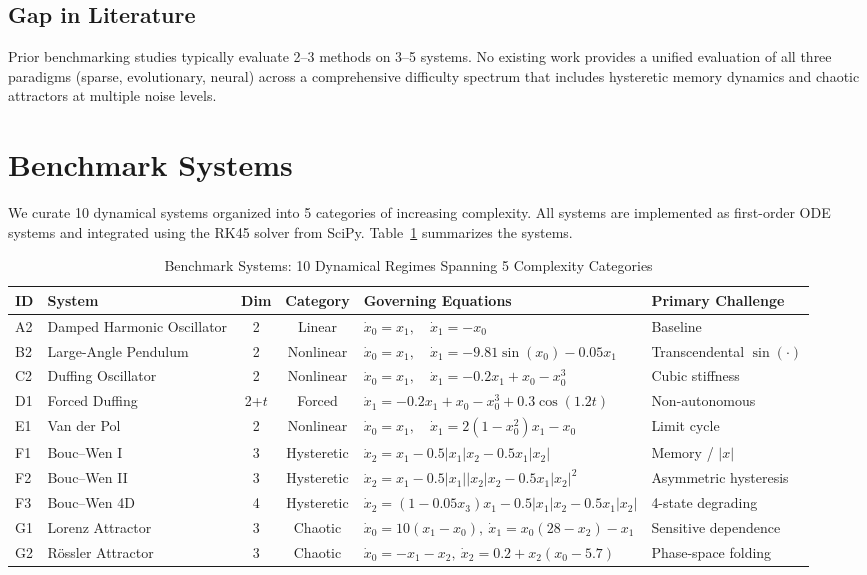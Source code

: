 \documentclass[conference]{IEEEtran}
\begin{document}
\subsection{Gap in Literature}
Prior benchmarking studies typically evaluate 2--3 methods on 3--5 systems. No existing work provides a unified evaluation of all three paradigms (sparse, evolutionary, neural) across a comprehensive difficulty spectrum that includes hysteretic memory dynamics and chaotic attractors at multiple noise levels.

\section{Benchmark Systems}
\label{sec:systems}

We curate 10 dynamical systems organized into 5 categories of increasing complexity. All systems are implemented as first-order ODE systems and integrated using the RK45 solver from SciPy. Table~\ref{tab:systems} summarizes the systems.

\begin{table}[!ht]
\centering
\caption{Benchmark Systems: 10 Dynamical Regimes Spanning 5 Complexity Categories}
\label{tab:systems}
\begin{tabular}{@{}llccll@{}}
\toprule
\textbf{ID} & \textbf{System} & \textbf{Dim} & \textbf{Category} & \textbf{Governing Equations} & \textbf{Primary Challenge} \\
\midrule
A2 & Damped Harmonic Oscillator & 2 & Linear &
$\dot{x}_0 = x_1,\quad \dot{x}_1 = -x_0$ & Baseline \\
\midrule
B2 & Large-Angle Pendulum & 2 & Nonlinear &
$\dot{x}_0 = x_1,\quad \dot{x}_1 = -9.81\sin(x_0) - 0.05 x_1$ & Transcendental $\sin(\cdot)$ \\
\midrule
C2 & Duffing Oscillator & 2 & Nonlinear &
$\dot{x}_0 = x_1,\quad \dot{x}_1 = -0.2 x_1 + x_0 - x_0^3$ & Cubic stiffness \\
\midrule
D1 & Forced Duffing & 2+$t$ & Forced &
$\dot{x}_1 = -0.2 x_1 + x_0 - x_0^3 + 0.3\cos(1.2t)$ & Non-autonomous \\
\midrule
E1 & Van der Pol & 2 & Nonlinear &
$\dot{x}_0 = x_1,\quad \dot{x}_1 = 2(1 - x_0^2)x_1 - x_0$ & Limit cycle \\
\midrule
F1 & Bouc--Wen I & 3 & Hysteretic &
$\dot{x}_2 = x_1 - 0.5|x_1|x_2 - 0.5 x_1|x_2|$ & Memory / $|x|$ \\
\midrule
F2 & Bouc--Wen II & 3 & Hysteretic &
$\dot{x}_2 = x_1 - 0.5|x_1||x_2|x_2 - 0.5 x_1|x_2|^2$ & Asymmetric hysteresis \\
\midrule
F3 & Bouc--Wen 4D & 4 & Hysteretic &
$\dot{x}_2 = (1 - 0.05 x_3)x_1 - 0.5|x_1|x_2 - 0.5 x_1|x_2|$ & 4-state degrading \\
\midrule
G1 & Lorenz Attractor & 3 & Chaotic &
$\dot{x}_0 = 10(x_1 - x_0),\ \dot{x}_1 = x_0(28 - x_2) - x_1$ & Sensitive dependence \\
\midrule
G2 & R\"{o}ssler Attractor & 3 & Chaotic &
$\dot{x}_0 = -x_1 - x_2,\ \dot{x}_2 = 0.2 + x_2(x_0 - 5.7)$ & Phase-space folding \\
\bottomrule
\end{tabular}
\end{table}
\end{document}

